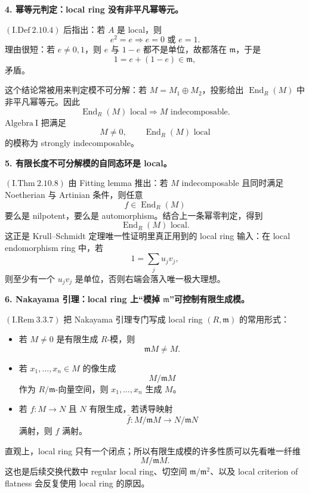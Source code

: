 \documentclass[a4paper]{ctexart}
\theoremstyle{definition}
\theoremstyle{analysis}
\theoremstyle{plain}
\begin{document}
\medskip

\textbf{4. 幂等元判定：local ring 没有非平凡幂等元。}

\((\mathrm{I.Def}\ 2.10.4)\) 后指出：若 \(A\) 是 local，则
\[
  e^2=e
  \Longrightarrow
  e=0\text{ 或 }e=1.
\]
理由很短：若 \(e\ne0,1\)，则 \(e\) 与 \(1-e\) 都不是单位，故都落在 \(\mathfrak m\)，于是
\[
  1=e+(1-e)\in \mathfrak m,
\]
矛盾。

这个结论常被用来判定模不可分解：若 \(M=M_1\oplus M_2\)，投影给出
\(\operatorname{End}_R(M)\) 中非平凡幂等元。因此
\[
  \operatorname{End}_R(M)\text{ local}
  \Longrightarrow
  M\text{ indecomposable}.
\]
\(\mathrm{Algebra\ I}\) 把满足
\[
  M\ne0,\qquad \operatorname{End}_R(M)\text{ local}
\]
的模称为 strongly indecomposable。

\medskip

\textbf{5. 有限长度不可分解模的自同态环是 local。}

\((\mathrm{I.Thm}\ 2.10.8)\) 由 Fitting lemma 推出：若 \(M\) indecomposable 且同时满足 Noetherian 与 Artinian 条件，则任意
\[
  f\in \operatorname{End}_R(M)
\]
要么是 nilpotent，要么是 automorphism。结合上一条幂零判定，得到
\[
  \operatorname{End}_R(M)\text{ local}.
\]
这正是 Krull--Schmidt 定理唯一性证明里真正用到的 local ring 输入：在 local endomorphism ring 中，若
\[
  1=\sum_j u_jv_j,
\]
则至少有一个 \(u_jv_j\) 是单位，否则右端会落入唯一极大理想。

\medskip

\textbf{6. Nakayama 引理：local ring 上“模掉 \(\mathfrak m\)”可控制有限生成模。}

\((\mathrm{I.Rem}\ 3.3.7)\) 把 Nakayama 引理专门写成 local ring \((R,\mathfrak m)\) 的常用形式：
\begin{itemize}
  \item 若 \(M\ne0\) 是有限生成 \(R\)-模，则
  \[
    \mathfrak mM\ne M.
  \]
  \item 若 \(x_1,\dots,x_n\in M\) 的像生成
  \[
    M/\mathfrak mM
  \]
  作为 \(R/\mathfrak m\)-向量空间，则 \(x_1,\dots,x_n\) 生成 \(M\)。
  \item 若 \(f:M\to N\) 且 \(N\) 有限生成，若诱导映射
  \[
    \bar f:M/\mathfrak mM\to N/\mathfrak mN
  \]
  满射，则 \(f\) 满射。
\end{itemize}

直观上，local ring 只有一个闭点；所以有限生成模的许多性质可以先看唯一纤维
\[
  M/\mathfrak mM.
\]
这也是后续交换代数中 regular local ring、切空间
\(\mathfrak m/\mathfrak m^2\)、以及 local criterion of flatness 会反复使用 local ring 的原因。
\end{document}
